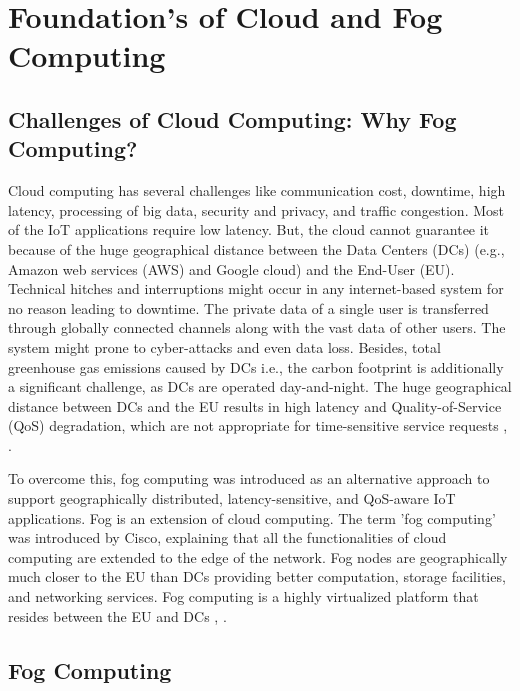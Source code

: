 \section{Foundation's of Cloud and Fog Computing}


\subsection{Challenges of Cloud Computing: Why Fog Computing?}
Cloud computing has several challenges like communication cost, downtime, high latency, processing of big data, security and privacy, and traffic congestion.
Most of the IoT applications require low latency. But, the cloud cannot guarantee it because of the huge geographical distance between the Data Centers (DCs) (e.g., Amazon web services (AWS) and Google cloud) and the End-User (EU).
Technical hitches and interruptions might occur in any internet-based system for no reason leading to downtime. 
The private data of a single user is transferred through globally connected channels along with the vast data of other users. The system might prone to cyber-attacks and even data loss.  
Besides, total greenhouse gas emissions caused by DCs i.e., the carbon footprint is additionally a significant challenge, as DCs are operated day-and-night.
The huge geographical distance between DCs and the EU results in high latency and Quality-of-Service (QoS) degradation, which are not appropriate for time-sensitive service requests \cite{mukherjee2018survey}, \cite{nat}. \par

To overcome this, fog computing was introduced as an alternative approach to support geographically distributed, latency-sensitive, and QoS-aware IoT applications.
Fog is an extension of cloud computing. The term 'fog computing' was introduced by Cisco, explaining that all the functionalities of cloud computing are extended to the edge of the network. 
Fog nodes are geographically much closer to the EU than DCs providing better computation, storage facilities, and networking services. Fog computing is a highly virtualized platform that resides between the EU and DCs \cite{mukherjee2018survey}, \cite{nat}. 


\subsection{Fog Computing}

